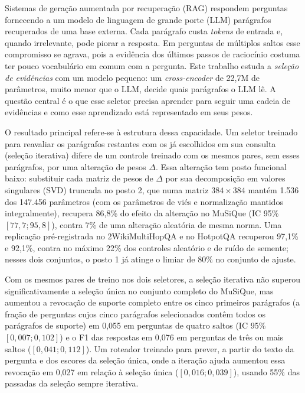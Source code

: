 \begin{resumo}
Sistemas de geração aumentada por recuperação (RAG) respondem perguntas fornecendo a um modelo de linguagem de grande porte (LLM) parágrafos recuperados de uma base externa. Cada parágrafo custa \textit{tokens} de entrada e, quando irrelevante, pode piorar a resposta. Em perguntas de múltiplos saltos esse compromisso se agrava, pois a evidência dos últimos passos de raciocínio costuma ter pouco vocabulário em comum com a pergunta. Este trabalho estuda a \emph{seleção de evidências} com um modelo pequeno: um \textit{cross-encoder} de 22,7M de parâmetros, muito menor que o LLM, decide quais parágrafos o LLM lê. A questão central é o que esse seletor precisa aprender para seguir uma cadeia de evidências e como esse aprendizado está representado em seus pesos.

O resultado principal refere-se à estrutura dessa capacidade. Um seletor treinado para reavaliar os parágrafos restantes com os já escolhidos em sua consulta (seleção iterativa) difere de um controle treinado com os mesmos pares, sem esses parágrafos, por uma alteração de pesos $\Delta$. Essa alteração tem posto funcional baixo: substituir cada matriz de pesos de $\Delta$ por sua decomposição em valores singulares (SVD) truncada no posto 2, que numa matriz $384\times384$ mantém 1.536 dos 147.456 parâmetros (com os parâmetros de viés e normalização mantidos integralmente), recupera 86,8\% do efeito da alteração no MuSiQue (IC 95\% $[77{,}7; 95{,}8]$), contra 7\% de uma alteração aleatória de mesma norma. Uma replicação pré-registrada no 2WikiMultiHopQA e no HotpotQA recuperou 97,1\% e 92,1\%, contra no máximo 22\% dos controles aleatório e de ruído de semente; nesses dois conjuntos, o posto 1 já atinge o limiar de 80\% no conjunto de ajuste.

Com os mesmos pares de treino nos dois seletores, a seleção iterativa não superou significativamente a seleção única no conjunto completo do MuSiQue, mas aumentou a revocação de suporte completo entre os cinco primeiros parágrafos (a fração de perguntas cujos cinco parágrafos selecionados contêm todos os parágrafos de suporte) em 0,055 em perguntas de quatro saltos (IC 95\% $[0{,}007; 0{,}102]$) e o F1 das respostas em 0,076 em perguntas de três ou mais saltos ($[0{,}041; 0{,}112]$). Um roteador treinado para prever, a partir do texto da pergunta e dos escores da seleção única, onde a iteração ajuda aumentou essa revocação em 0,027 em relação à seleção única ($[0{,}016; 0{,}039]$), usando 55\% das passadas da seleção sempre iterativa.


\end{resumo}
